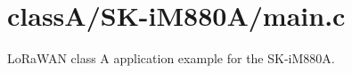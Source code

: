 \hypertarget{classA_2SK-iM880A_2main_8c-example}{}\section{class\+A/\+S\+K-\/i\+M880\+A/main.\+c}
Lo\+Ra\+W\+AN class A application example for the S\+K-\/i\+M880A.


\begin{DoxyCodeInclude}
\end{DoxyCodeInclude}
 